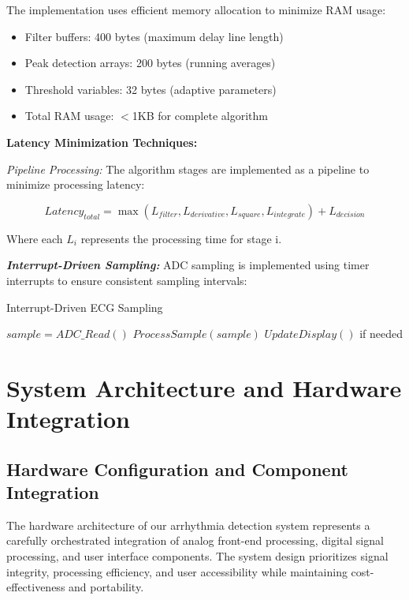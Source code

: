 \documentclass[12pt,a4paper]{article}
\begin{document}
The implementation uses efficient memory allocation to minimize RAM usage:
\begin{itemize}
\item Filter buffers: 400 bytes (maximum delay line length)
\item Peak detection arrays: 200 bytes (running averages)
\item Threshold variables: 32 bytes (adaptive parameters)
\item Total RAM usage: $<$1KB for complete algorithm
\end{itemize}

\vspace{0.5cm}

\textbf{Latency Minimization Techniques:}

\textit{Pipeline Processing:}
The algorithm stages are implemented as a pipeline to minimize processing latency:

\begin{equation*}
Latency_{total} = \max(L_{filter}, L_{derivative}, L_{square}, L_{integrate}) + L_{decision}
\end{equation*}

Where each $L_i$ represents the processing time for stage i.

\textbf{\textit{Interrupt-Driven Sampling:}}
ADC sampling is implemented using timer interrupts to ensure consistent sampling intervals:

\begin{algorithm}
\caption{Interrupt-Driven ECG Sampling}
\begin{algorithmic}
    \STATE $sample = ADC\_Read()$
    \STATE $ProcessSample(sample)$
    \STATE $UpdateDisplay()$ if needed
\ENDPROCEDURE
\end{algorithmic}
\end{algorithm}


\section{System Architecture and Hardware Integration}

\subsection{Hardware Configuration and Component Integration}

The hardware architecture of our arrhythmia detection system represents a carefully orchestrated integration of analog front-end processing, digital signal processing, and user interface components. The system design prioritizes signal integrity, processing efficiency, and user accessibility while maintaining cost-effectiveness and portability.
\end{document}
